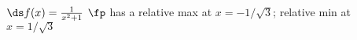 {$\ds f(x) = \frac{1}{x^2+1}$
}
{$\fp$ has a relative max at $x = -1/\sqrt{3}$;
relative min at $x=1/\sqrt{3}$
}
